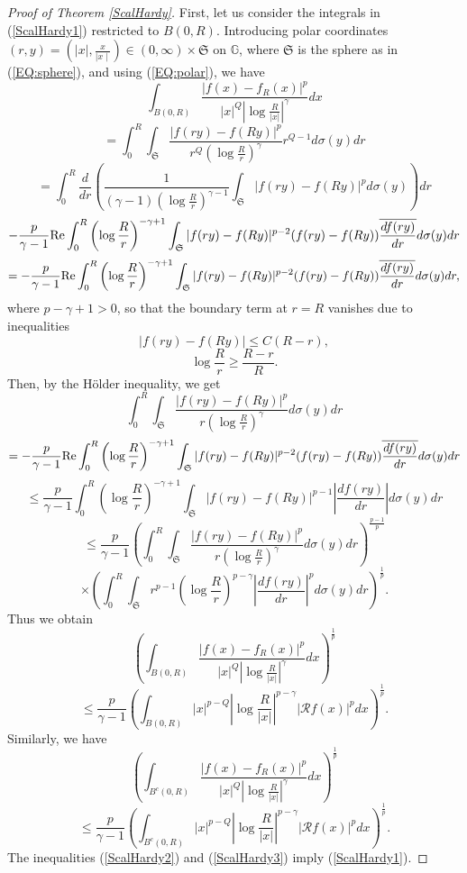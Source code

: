 \documentclass[a4paper,12pt,reqno]{amsart}
\renewcommand\eqref[1]{(\ref{#1})} %
\numberwithin{equation}{section}
\theoremstyle{plain}
\theoremstyle{definition}
\renewcommand{\wp}{\mathfrak S}
\begin{document}
\begin{proof}[Proof of Theorem \ref{ScalHardy}]
First, let us consider the integrals in \eqref{ScalHardy1} restricted to
$B(0, R)$. Introducing polar coordinates $(r,y)=(|x|, \frac{x}{\mid x\mid})\in (0,\infty)\times\wp$ on $\mathbb{G}$, where $\wp$ is the sphere as in \eqref{EQ:sphere}, and using \eqref{EQ:polar}, we have
$$\int_{B(0,R)}\frac{|f(x)-f_{R}(x)|^{p}}
{|x|^{Q}\left|\log\frac{R}{|x|}\right|^{\gamma}}dx$$
$$=\int_{0}^{R}\int_{\wp}\frac{|f(ry)-f(Ry)|^{p}}{r^{Q}\left(\log\frac{R}{r}\right)^{\gamma}}r^{Q-1}d\sigma(y)dr$$
$$=\int_{0}^{R}\frac{d}{dr}\left(\frac{1}{(\gamma-1)\left(\log\frac{R}{r}\right)^{\gamma-1}}\int_{\wp}|f(ry)-f(Ry)|^{p}d\sigma(y)\right)dr$$
$$-\frac{p}{\gamma-1}{\rm Re}\int_{0}^{R}\left(\log\frac{R}{r}\right)^{-\gamma+1}
\int_{\wp}|f(ry)-f(Ry)|^{p-2}(f(ry)-f(Ry))\overline{\frac{df(ry)}{dr}}d\sigma(y)dr$$
$$=-\frac{p}{\gamma-1}{\rm Re}\int_{0}^{R}\left(\log\frac{R}{r}\right)^{-\gamma+1}\int_{\wp}|f(ry)-f(Ry)|^{p-2}
(f(ry)-f(Ry))\overline{\frac{df(ry)}{dr}}d\sigma(y)dr,$$
where $p-\gamma+1>0$, so that the boundary term at $r=R$ vanishes due to inequalities
$$|f(ry)-f(Ry)|\leq C(R-r),$$
$$\log\frac{R}{r}\geq\frac{R-r}{R}.$$
Then, by the H\"{o}lder inequality, we get
$$\int_{0}^{R}\int_{\wp}\frac{|f(ry)-f(Ry)|^{p}}{r\left(\log\frac{R}{r}\right)^{\gamma}}d\sigma(y)dr$$
$$=-\frac{p}{\gamma-1}{\rm Re}\int_{0}^{R}\left(\log\frac{R}{r}\right)^{-\gamma+1}\int_{\wp}|f(ry)-f(Ry)|^{p-2}
(f(ry)-f(Ry))\overline{\frac{df(ry)}{dr}}d\sigma(y)dr$$
$$\leq\frac{p}{\gamma-1}\int_{0}^{R}\left(\log\frac{R}{r}\right)^{-\gamma+1}\int_{\wp}|f(ry)-f(Ry)|^{p-1}\left|\frac{df(ry)}{dr}\right| d\sigma(y)dr$$
$$\leq\frac{p}{\gamma-1}\left(\int_{0}^{R}\int_{\wp}\frac{|f(ry)-f(Ry)|^{p}}{r\left(\log\frac{R}{r}\right)
^{\gamma}}d\sigma(y)dr\right)^{\frac{p-1}{p}}$$
$$\times\left(\int_{0}^{R}\int_{\wp}r^{p-1}\left(\log\frac{R}{r}\right)^{p-\gamma}
\left|\frac{df(ry)}{dr}\right|^{p}d\sigma(y)dr\right)^{\frac{1}{p}}.$$
Thus we obtain
$$\left(\int_{B(0,R)}\frac{\left|f(x)-f_{R}(x)\right|^{p}}{|x|^{Q}\left|\log\frac{R}{|x|}\right|^{\gamma}}
dx\right)^{\frac{1}{p}}$$
\begin{equation}\label{ScalHardy2}\leq\frac{p}{\gamma-1}\left(\int_{B(0,R)}|x|^{p-Q}\left|\log\frac{R}{|x|}\right|^{p-\gamma}
\left|\mathcal{R}f(x)\right|^{p}dx\right)^{\frac{1}{p}}.
\end{equation}
Similarly, we have
$$\left(\int_{B^{c}(0,R)}\frac{\left|f(x)-f_{R}(x)\right|^{p}}{|x|^{Q}\left|\log\frac{R}{|x|}\right|^{\gamma}}
dx\right)^{\frac{1}{p}}$$
\begin{equation}\label{ScalHardy3}\leq\frac{p}{\gamma-1}\left(\int_{B^{c}(0,R)}|x|^{p-Q}\left|\log\frac{R}{|x|}\right|
^{p-\gamma}\left|\mathcal{R}f(x)\right|^{p}dx\right)^{\frac{1}{p}}.
\end{equation}
The inequalities \eqref{ScalHardy2} and \eqref{ScalHardy3} imply \eqref{ScalHardy1}.


\end{proof}
\end{document}
